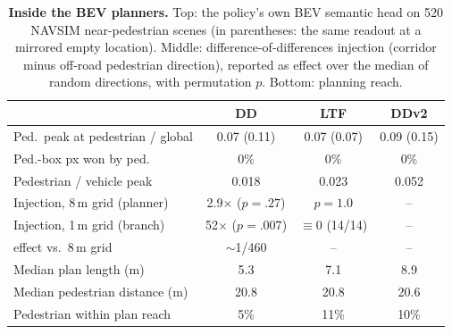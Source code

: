 \begin{table}[t]
\centering
\caption{\textbf{Inside the BEV planners.} Top: the policy's own BEV
semantic head on 520 NAVSIM near-pedestrian scenes (in parentheses: the same readout at a mirrored empty location). Middle: difference-of-differences injection (corridor minus off-road pedestrian direction),
reported as effect over the median of random directions, with permutation $p$. Bottom: planning reach.}
\label{tab:mech}
\footnotesize
\setlength{\tabcolsep}{3pt}
\setlength{\tabcolsep}{2.5pt}
\begin{tabular}{@{}p{3.35cm}ccc@{}}
\toprule
 & DD & LTF & DDv2 \\
\midrule
Ped.\ peak at pedestrian / global & 0.07 (0.11) & 0.07 (0.07) & 0.09 (0.15) \\
Ped.-box px won by ped. & 0\% & 0\% & 0\% \\
Pedestrian / vehicle peak & 0.018 & 0.023 & 0.052 \\
\midrule
Injection, 8\,m grid (planner) & 2.9$\times$ ($p{=}.27$) & $p{=}1.0$ & -- \\
Injection, 1\,m grid (branch) & 52$\times$ ($p{=}.007$) & $\equiv0$ (14/14) & -- \\
\quad effect vs.\ 8\,m grid & $\sim$1/460 & -- & -- \\
\midrule
Median plan length (m) & 5.3 & 7.1 & 8.9 \\
Median pedestrian distance (m) & 20.8 & 20.8 & 20.6 \\
Pedestrian within plan reach & 5\% & 11\% & 10\% \\
\bottomrule
\end{tabular}
\end{table}
